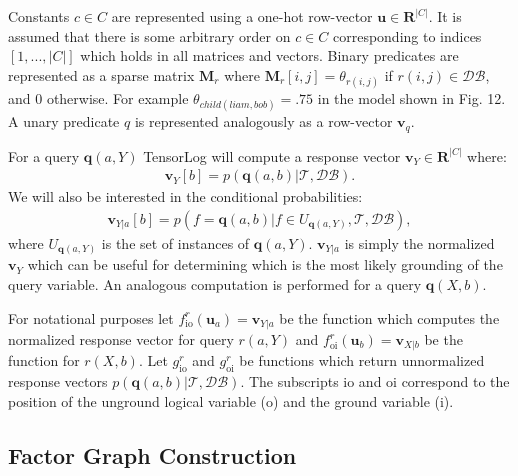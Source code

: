 \documentclass[11pt]{article}
\begin{document}
Constants $c \in C$ are represented using a one-hot row-vector $\textbf{u} \in \mathbf{R}^{|C|}$.  It is assumed that there is some arbitrary order on $c \in C$ corresponding to indices $[1, ..., |C|]$ which holds in all matrices and vectors.  Binary predicates are represented as a sparse matrix $\textbf{M}_r$ where $\textbf{M}_r[i, j] = \theta_{r(i, j)}$ if $r(i, j) \in \mathcal{DB}$, and 0 otherwise.  For example $\theta_{child(liam, bob)} = .75$ in the model shown in Fig. 12.  A unary predicate $q$ is represented analogously as a row-vector $\textbf{v}_q$.

For a query $\textbf{q}(a, Y)$ TensorLog will compute a response vector $\textbf{v}_Y \in \mathbf{R}^{|C|}$ where:
\begin{gather*}
\textbf{v}_{Y}[b] = p( \textbf{q}(a, b) | \mathcal{T}, \mathcal{DB}).
\end{gather*}  We will also be interested in the conditional probabilities:
\begin{gather*}
\textbf{v}_{Y|a}[b] = p( f = \textbf{q}(a, b) |f \in U_{\textbf{q}(a, Y)}, \mathcal{T}, \mathcal{DB}),
\end{gather*} where $U_{\textbf{q}(a, Y)}$ is the set of instances of $\textbf{q}(a, Y)$.  $\textbf{v}_{Y|a}$ is simply the normalized $\textbf{v}_{Y}$ which can be useful for determining which is the most likely grounding of the query variable.  An analogous computation is performed for a query $\textbf{q}(X, b)$.  

For notational purposes let $f_{\text{io}}^{r}(\textbf{u}_a) = \textbf{v}_{Y|a}$ be the function which computes the normalized response vector for query $r(a, Y)$ and $f_{\text{oi}}^{r}(\textbf{u}_b) = \textbf{v}_{X|b}$ be the function for $r(X, b)$.  Let $g_{\text{io}}^{r}$ and $g_{\text{oi}}^{r}$ be functions which return unnormalized response vectors $p( \textbf{q}(a, b) | \mathcal{T}, \mathcal{DB})$.  The subscripts io and oi correspond to the position of the unground logical variable (o) and the ground variable (i).  

\subsection{Factor Graph Construction}
\end{document}
